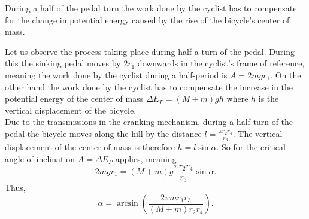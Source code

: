 \hinteng
During a half of the pedal turn the work done by the cyclist has to compensate for the change in potential energy caused by the rise of the bicycle’s center of mass.

\solueng
Let us observe the process taking place during half a turn of the pedal. During this the sinking pedal moves by $2r_1$ downwards in the cyclist’s frame of reference, meaning the work done by the cyclist during a half-period is $A = 2mgr_1$. On the other hand the work done by the cyclist has to compensate the increase in the potential energy of the center of mass $\Delta E_P = (M + m)gh$ where $h$ is the vertical displacement of the bicycle.\\
Due to the transmissions in the cranking mechanism, during a half turn of the pedal the bicycle moves along the hill by the distance $l=\frac{\pi r_2 r_4}{r_3}$. The vertical displacement of the center of mass is therefore $h = l\sin\alpha$. So for the critical angle of inclination $A = \Delta E_P$ applies, meaning 
\[
2mgr_1 = (M + m)g\frac{\pi r_2r_4}{r_3}\sin\alpha.
\]
Thus, 
\[
\alpha = \arcsin\left(\frac{2\pi mr_1r_3}{(M + m)r_2r_4}\right).
\]
\probend
